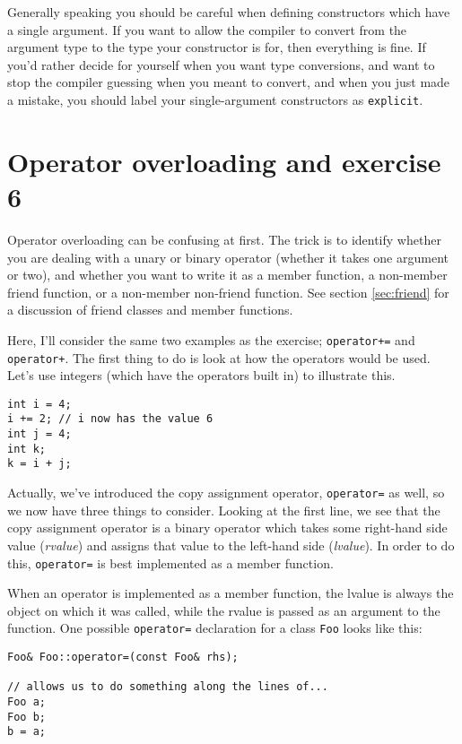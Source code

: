 \documentclass[a4paper]{scrartcl}
\begin{document}
Generally speaking you should be careful when defining constructors which have a single argument. If you want to allow the compiler to convert from the argument type to the type your constructor is for, then everything is fine. If you'd rather decide for yourself when you want type conversions, and want to stop the compiler guessing when you meant to convert, and when you just made a mistake, you should label your single-argument constructors as \texttt{explicit}.

\section{Operator overloading and exercise 6}
Operator overloading can be confusing at first. The trick is to identify whether you are dealing with a unary or binary operator (whether it takes one argument or two), and whether you want to write it as a member function, a non-member friend function, or a non-member non-friend function. See section \ref{sec:friend} for a discussion of friend classes and member functions.

Here, I'll consider the same two examples as the exercise; \verb|operator+=| and \verb|operator+|.  The first thing to do is look at how the operators would be used. Let's use integers (which have the operators built in) to illustrate this.  

\begin{verbatim}
int i = 4;
i += 2; // i now has the value 6
int j = 4;
int k;
k = i + j;
\end{verbatim}

Actually, we've introduced the copy assignment operator, \verb|operator=| as well, so we now have three things to consider. Looking at the first line, we see that the copy assignment operator is a binary operator which takes some right-hand side value (\emph{rvalue}) and assigns that value to the left-hand side (\emph{lvalue}). In order to do this, \verb|operator=| is best implemented as a member function.

When an operator is implemented as a member function, the lvalue is always the object on which it was called, while the rvalue is passed as an argument to the function. One possible \verb|operator=| declaration for a class \verb|Foo| looks like this:

\begin{verbatim}
Foo& Foo::operator=(const Foo& rhs);

// allows us to do something along the lines of...
Foo a;
Foo b;
b = a;
\end{verbatim}
\end{document}
